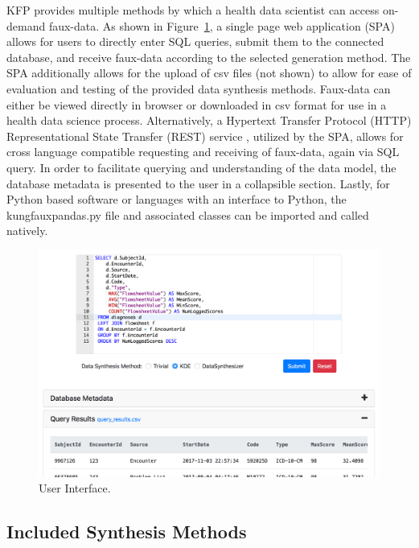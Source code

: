 \documentclass{amia}
\begin{document}
KFP provides multiple methods by which a health data scientist can access on-demand faux-data. As shown in Figure~\ref{fig:ui}, a single page web application (SPA) allows for users to directly enter SQL queries, submit them to the connected database, and receive faux-data according to the selected generation method. The SPA additionally allows for the upload of csv files (not shown) to allow for ease of evaluation and testing of the provided data synthesis methods. Faux-data can either be viewed directly in browser or downloaded in csv format for use in a health data science process. Alternatively, a Hypertext Transfer Protocol (HTTP) Representational State Transfer (REST) service \cite{w3c_working_group_webservices}, utilized by the SPA, allows for cross language compatible requesting and receiving of faux-data, again via SQL query. In order to facilitate querying and understanding of the data model, the database metadata is presented to the user in a collapsible section. Lastly, for Python based software or languages with an interface to Python, the kungfauxpandas.py file and associated classes can be imported and called natively.

\begin{figure}[ht]
  \centering
  \includegraphics[width=\textwidth]{ui_screenshot3}
  \caption{User Interface.}
  \label{fig:ui}
\end{figure}

\subsection{Included Synthesis Methods}
\end{document}
